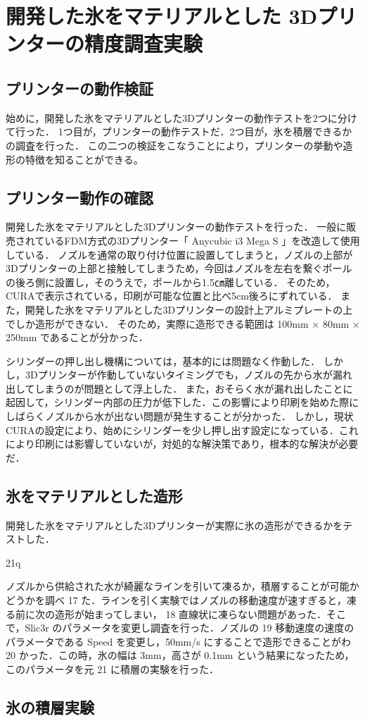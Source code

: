 \chapter{開発した氷をマテリアルとした
3Dプリンターの精度調査実験}
\label{chp:first}

\section{プリンターの動作検証}
\label{sec:paragraph}
始めに，開発した氷をマテリアルとした3Dプリンターの動作テストを2つに分けて行った．
1つ目が，プリンターの動作テストだ．2つ目が，氷を積層できるかの調査を行った．
この二つの検証をこなうことにより，プリンターの挙動や造形の特徴を知ることができる。

\section{プリンター動作の確認}
\label{sec:paragraph}
開発した氷をマテリアルとした3Dプリンターの動作テストを行った．
一般に販売されているFDM方式の3Dプリンター「 Anycubic i3 Mega S 」を改造して使用している．
ノズルを通常の取り付け位置に設置してしまうと，ノズルの上部が3Dプリンターの上部と接触してしまうため，今回はノズルを左右を繋ぐポールの後ろ側に設置し，そのうえで，ポールから1.5㎝離している．
そのため，CURAで表示されている，印刷が可能な位置と比べ5cm後ろにずれている．
また，開発した氷をマテリアルとした3Dプリンターの設計上アルミプレートの上でしか造形ができない．
そのため，実際に造形できる範囲は 100mm × 80mm × 250mm であることが分かった．

シリンダーの押し出し機構については，基本的には問題なく作動した．
しかし，3Dプリンターが作動していないタイミングでも，ノズルの先から水が漏れ出してしまうのが問題として浮上した．
また，おそらく水が漏れ出したことに起因して，シリンダー内部の圧力が低下した．この影響により印刷を始めた際にしばらくノズルから水が出ない問題が発生することが分かった．
しかし，現状CURAの設定により、始めにシリンダーを少し押し出す設定になっている．これにより印刷には影響していないが，対処的な解決策であり，根本的な解決が必要だ．


\section{氷をマテリアルとした造形}
\label{sec:paragraph}
開発した氷をマテリアルとした3Dプリンターが実際に氷の造形ができるかをテストした．

21q


ノズルから供給された水が綺麗なラインを引いて凍るか，積層することが可能かどうかを調べ
17 た．ラインを引く実験ではノズルの移動速度が速すぎると，凍る前に次の造形が始まってしまい，
18 直線状に凍らない問題があった．そこで，Slic3r のパラメータを変更し調査を行った．ノズルの
19 移動速度の速度のパラメータである Speed を変更し，50mm/s にすることで造形できることがわ
20 かった．この時，氷の幅は 3mm，高さが 0.1mm という結果になったため，このパラメータを元
21 に積層の実験を行った．


\section{氷の積層実験}
\label{sec:paragraph}




